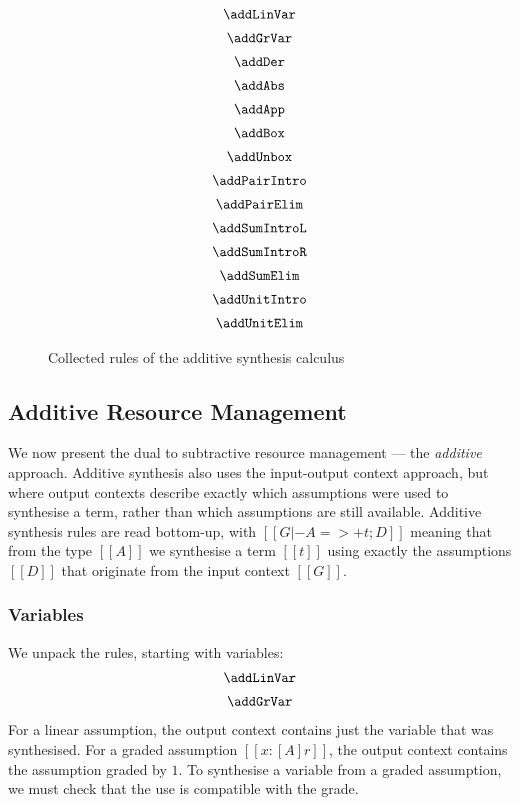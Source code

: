 \begin{figure}[H]
\begin{align*}
\begin{array}{c}
  \addLinVar
\\[0.5em]
  \addGrVar
\\[0.5em]
  \addDer
\\[0.5em]
  \addAbs
\\[0.5em]
  \addApp
\\[0.5em]
  \addBox
  \\[0.5em]
  \addUnbox
\\[0.5em]
  \addPairIntro
\\[0.5em]
  \addPairElim
\\[0.5em]
  \addSumIntroL
\\[0.5em]
  \addSumIntroR
\\[0.5em]
  \addSumElim
\\[0.5em]
  \addUnitIntro
\\[0.5em]
  \addUnitElim
      \end{array}
  \end{align*}
\caption{Collected rules of the additive synthesis calculus}
\label{fig:add-rules}
  \end{figure}

\subsection{Additive Resource Management}
\label{subsec:additive}
We now present the dual to subtractive resource management --- the
\emph{additive} approach.
Additive synthesis also uses the input-output context approach, but where
output contexts describe exactly which assumptions were used to synthesise
a term, rather than which assumptions are still available. Additive
   synthesis rules are read bottom-up, with $[[G |- A =>+ t; D]]$
  meaning that from the type $[[A]]$ we synthesise a term $[[t]]$ using
  exactly the assumptions $[[D]]$ that originate from the input
  context $[[G]]$.

  \subsubsection{Variables}
  We unpack the rules, starting with variables:
%
\begin{align*}
  \begin{array}{c}
  \addLinVar
  \\[0.5em]
  \addGrVar
  \end{array}
  \end{align*}
%
For a linear assumption, the output context contains
just the variable that was synthesised. For a graded assumption $[[x : [A] r]]$, the output
context contains the assumption graded by $1$. To synthesise a
variable from a graded assumption, we must check that the use is
compatible with the grade.

